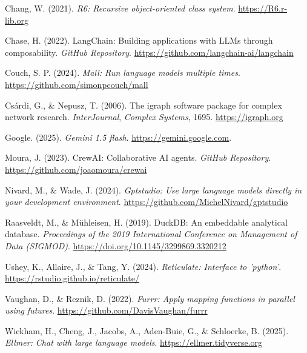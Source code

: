\documentclass[
]{article}
\newlength{\cslhangindent}
\newenvironment{CSLReferences}[2] %
 {\begin{list}{}{%
  \setlength{\itemindent}{0pt}
  \setlength{\leftmargin}{0pt}
  \setlength{\parsep}{0pt}
  \ifodd #1
   \setlength{\leftmargin}{\cslhangindent}
   \setlength{\itemindent}{-1\cslhangindent}
  \fi
  \setlength{\itemsep}{#2\baselineskip}}}
 {\end{list}}
\begin{document}
\protect{}\label{refs}
\begin{CSLReferences}{1}{0}
Chang, W. (2021). \emph{R6: Recursive object-oriented class system}.
\url{https://R6.r-lib.org}

Chase, H. (2022). LangChain: Building applications with LLMs through
composability. \emph{GitHub Repository}.
\url{https://github.com/langchain-ai/langchain}

Couch, S. P. (2024). \emph{Mall: Run language models multiple times}.
\url{https://github.com/simonpcouch/mall}

Csárdi, G., \& Nepusz, T. (2006). The igraph software package for
complex network research. \emph{InterJournal}, \emph{Complex Systems},
1695. \url{https://igraph.org}

Google. (2025). \emph{Gemini 1.5 flash}.
\url{https://gemini.google.com}.

Moura, J. (2023). CrewAI: Collaborative AI agents. \emph{GitHub
Repository}. \url{https://github.com/joaomoura/crewai}

Nivard, M., \& Wade, J. (2024). \emph{Gptstudio: Use large language
models directly in your development environment}.
\url{https://github.com/MichelNivard/gptstudio}

Raasveldt, M., \& Mühleisen, H. (2019). DuckDB: An embeddable analytical
database. \emph{Proceedings of the 2019 International Conference on
Management of Data (SIGMOD)}.
\url{https://doi.org/10.1145/3299869.3320212}

Ushey, K., Allaire, J., \& Tang, Y. (2024). \emph{Reticulate: Interface
to 'python'}. \url{https://rstudio.github.io/reticulate/}

Vaughan, D., \& Reznik, D. (2022). \emph{Furrr: Apply mapping functions
in parallel using futures}. \url{https://github.com/DavisVaughan/furrr}

Wickham, H., Cheng, J., Jacobs, A., Aden-Buie, G., \& Schloerke, B.
(2025). \emph{Ellmer: Chat with large language models}.
\url{https://ellmer.tidyverse.org}

\end{CSLReferences}
\end{document}
